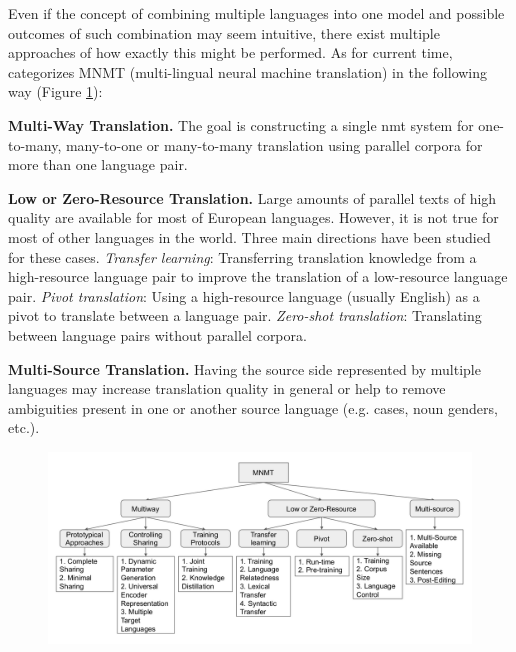 Even if the concept of combining multiple languages into one model and possible outcomes
of such combination may seem intuitive, there exist multiple approaches of how exactly
this might be performed. As for current time, \cite{Dabre2019} categorizes
MNMT (multi-lingual neural machine translation) in the following way
(Figure \ref{fig:mnmt_categorized}):

\textbf{Multi-Way Translation.}
The goal is constructing a single \acrshort{nmt} system for
one-to-many, many-to-one or many-to-many
translation using parallel corpora for more than one language pair.

\textbf{Low or Zero-Resource Translation.}
Large amounts of parallel texts of high quality are available for most of European
languages. However, it is not true for most of other languages in the world.
Three main directions have been studied for these cases.
\textit{Transfer learning}: Transferring translation knowledge from a high-resource language pair
to improve the translation of a low-resource language pair.
\textit{Pivot translation}: Using a high-resource language (usually English) as a pivot to translate
between a language pair.
\textit{Zero-shot translation}: Translating between language pairs without parallel corpora.

\textbf{Multi-Source Translation.} Having the source side represented by multiple languages
may increase translation quality in general or help to remove ambiguities present in one or another
source language (e.g. cases, noun genders, etc.).


\begin{figure}[h]
	\begin{minipage}{0.9\textwidth}
	\centering
	\includegraphics[width=1.0\columnwidth]{img/dabre_2019_mnmt_categorized.png}
	\end{minipage}\hfill
	\label{fig:mnmt_categorized}
\end{figure}


